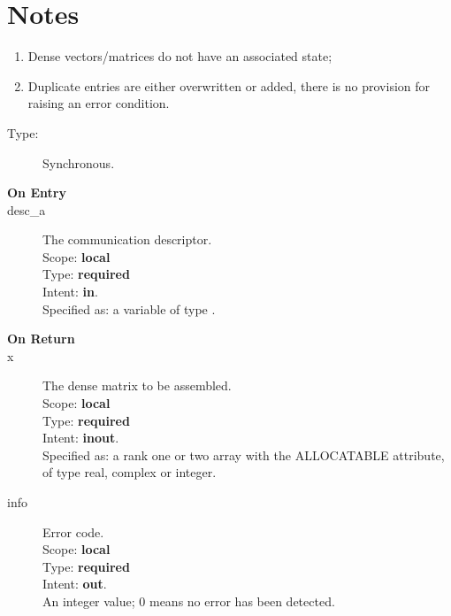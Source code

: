 \section*{Notes}
\begin{enumerate}
\item Dense vectors/matrices do not have an associated state;
\item Duplicate entries are either overwritten or added, there is no
  provision for raising an error condition. 
\end{enumerate}


%
%


\begin{description}
\item[Type:] Synchronous.
\item[\bf On Entry]
\item[desc\_a] The communication descriptor.\\
Scope: {\bf local} \\
Type: {\bf required}\\
Intent: {\bf in}.\\
Specified as: a variable of type \descdata.\\
\end{description}

\begin{description}
\item[\bf On Return]
\item[x] The dense matrix to be assembled.\\
Scope: {\bf local} \\
Type: {\bf required}\\
Intent: {\bf inout}.\\
Specified as: a rank one or two array with the ALLOCATABLE
attribute, of type real, complex or integer.\\
\item[info] Error code.\\
Scope: {\bf local} \\
Type: {\bf required} \\
Intent: {\bf out}.\\
An integer value; 0 means no error has been detected. 
\end{description}
%
%


